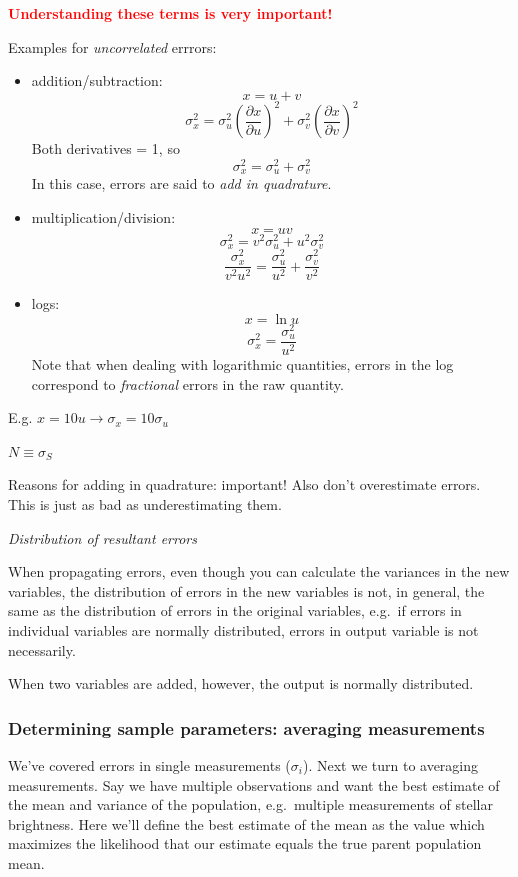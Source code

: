\documentclass[12pt]{article}
\begin{document}
\textcolor{red}{\textbf{Understanding these terms is very important!}}

Examples for \emph{uncorrelated} errrors:
\begin{itemize}
    \item addition/subtraction:
        $$ x = u + v $$
        $$ \sigma_x^2 = \sigma_u^2\left(\frac{\partial x}
        {\partial u}\right)^2
        + \sigma_v^2\left(\frac{\partial x}{\partial v}\right)^2 $$
        Both derivatives = 1, so
        $$ \sigma_x^2 = \sigma_u^2 + \sigma_v^2 $$
        In this case, errors are said to \emph{add in quadrature}.
    \item multiplication/division:
        $$ x = uv $$
        $$ \sigma_x^2 = v^2\sigma_u^2 + u^2\sigma_v^2 $$
        $$ \frac{\sigma_x^2}{v^2u^2} =
        \frac{\sigma_u^2}{u^2} + \frac{\sigma_v^2}{v^2}$$
    \item logs:
        $$ x = \ln u $$
        $$ \sigma_x^2 = \frac{\sigma_u^2}{u^2} $$
        Note that when dealing with logarithmic quantities, errors in
        the log correspond to \emph{fractional} errors in the raw
        quantity.
\end{itemize}

\textcolor{myBlue}{E.g. $x=10u \rightarrow \sigma_x=10\sigma_u$}

\textcolor{myBlue}{$N \equiv \sigma_S$}

\textcolor{myBlue}{Reasons for adding in quadrature: important!
Also don't overestimate errors. This is just as bad as
underestimating them.}

\emph{Distribution of resultant errors}

When propagating errors, even though you can calculate the variances
in the new variables, the distribution of errors in the new variables
is not, in general, the same as the distribution of errors in the
original variables, e.g.\ if errors in individual variables are
normally distributed, errors in output variable is not necessarily.

When two variables are added, however, the output is normally
distributed.


\textcolor{om}{\emph{}}


\subsubsection{Determining sample parameters: averaging measurements}
We've covered errors in single measurements ($\sigma_i$).
Next we turn to averaging measurements.
Say we have multiple observations and want the best
estimate of the mean and variance of the population, e.g.\ multiple
measurements of stellar brightness. Here we'll define the best
estimate of the mean as the value which maximizes the likelihood that
our estimate equals the true parent population mean.
\end{document}
